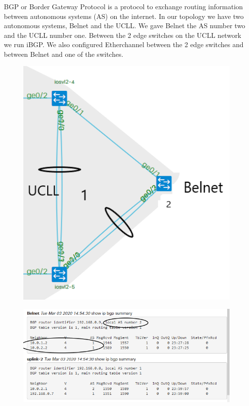 \documentclass{article}
\begin{document}
BGP or Border Gateway Protocol is a protocol to exchange routing information between autonomous systems (AS) on the internet.
In our topology we have two autonomous systems, Belnet and the UCLL. We gave Belnet the AS number two and the UCLL number one.
Between the 2 edge switches on the UCLL network we run iBGP. We also configured Etherchannel between the 2 edge switches and between Belnet and one of the switches.

\begin{figure}[H]
	\centering
	\includegraphics[width=\textwidth]{images/bgp_topologie.png}
\end{figure}

\newpage

\begin{figure}[H]
	\centering
	\includegraphics[width=\textwidth]{images/bgp_config.png}
\end{figure}
\end{document}
